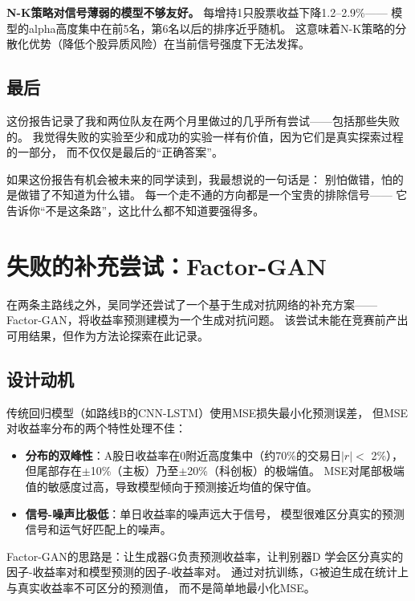 \documentclass[12pt,a4paper]{ctexart}
\begin{document}
\textbf{N-K策略对信号薄弱的模型不够友好。} 每增持1只股票收益下降1.2--2.9\%——
模型的alpha高度集中在前5名，第6名以后的排序近乎随机。
这意味着N-K策略的分散化优势（降低个股异质风险）在当前信号强度下无法发挥。

\subsection{最后}

这份报告记录了我和两位队友在两个月里做过的几乎所有尝试——包括那些失败的。
我觉得失败的实验至少和成功的实验一样有价值，因为它们是真实探索过程的一部分，
而不仅仅是最后的“正确答案”。

如果这份报告有机会被未来的同学读到，我最想说的一句话是：
别怕做错，怕的是做错了不知道为什么错。
每一个走不通的方向都是一个宝贵的排除信号——
它告诉你“不是这条路”，这比什么都不知道要强得多。


\section{失败的补充尝试：Factor-GAN}

在两条主路线之外，吴同学还尝试了一个基于生成对抗网络的补充方案——
Factor-GAN，将收益率预测建模为一个生成对抗问题。
该尝试未能在竞赛前产出可用结果，但作为方法论探索在此记录。

\subsection{设计动机}

传统回归模型（如路线B的CNN-LSTM）使用MSE损失最小化预测误差，
但MSE对收益率分布的两个特性处理不佳：
\begin{itemize}[leftmargin=*]
    \item \textbf{分布的双峰性}：A股日收益率在0附近高度集中（约70\%的交易日$|r|<$ 2\%），
          但尾部存在$\pm$10\%（主板）乃至$\pm$20\%（科创板）的极端值。
          MSE对尾部极端值的敏感度过高，导致模型倾向于预测接近均值的保守值。
    \item \textbf{信号-噪声比极低}：单日收益率的噪声远大于信号，
          模型很难区分真实的预测信号和运气好匹配上的噪声。
\end{itemize}

Factor-GAN的思路是：让生成器G负责预测收益率，让判别器D
学会区分真实的因子-收益率对和模型预测的因子-收益率对。
通过对抗训练，G被迫生成在统计上与真实收益率不可区分的预测值，
而不是简单地最小化MSE。
\end{document}
